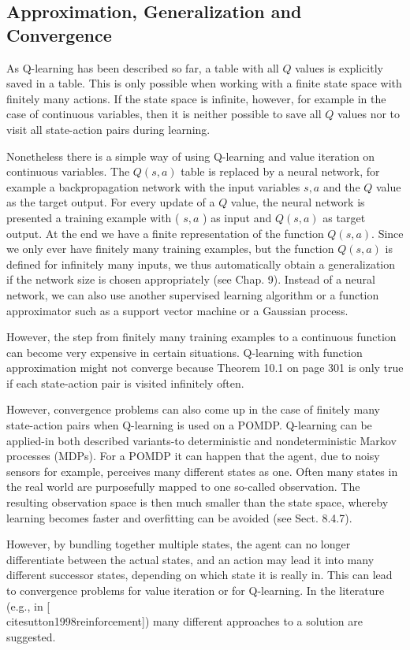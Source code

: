\documentclass[10pt]{book}
\begin{document}
\subsection*{Approximation, Generalization and Convergence}
As Q-learning has been described so far, a table with all $Q$ values is explicitly saved in a table. This is only possible when working with a finite state space with finitely many actions. If the state space is infinite, however, for example in the case of continuous variables, then it is neither possible to save all $Q$ values nor to visit all state-action pairs during learning.


Nonetheless there is a simple way of using Q-learning and value iteration on continuous variables. The $Q(s, a)$ table is replaced by a neural network, for example a backpropagation network with the input variables $s, a$ and the $Q$ value as the target output. For every update of a $Q$ value, the neural network is presented a training example with ( $s, a$ ) as input and $Q(s, a)$ as target output. At the end we have a finite representation of the function $Q(s, a)$. Since we only ever have finitely many training examples, but the function $Q(s, a)$ is defined for infinitely many inputs, we thus automatically obtain a generalization if the network size is chosen appropriately (see Chap. 9). Instead of a neural network, we can also use another supervised learning algorithm or a function approximator such as a support vector machine or a Gaussian process.

However, the step from finitely many training examples to a continuous function can become very expensive in certain situations. Q-learning with function approximation might not converge because Theorem 10.1 on page 301 is only true if each state-action pair is visited infinitely often.

However, convergence problems can also come up in the case of finitely many state-action pairs when Q-learning is used on a POMDP. Q-learning can be applied-in both described variants-to deterministic and nondeterministic Markov processes (MDPs). For a POMDP it can happen that the agent, due to noisy sensors for example, perceives many different states as one. Often many states in the real world are purposefully mapped to one so-called observation. The resulting observation space is then much smaller than the state space, whereby learning becomes faster and overfitting can be avoided (see Sect. 8.4.7).

However, by bundling together multiple states, the agent can no longer differentiate between the actual states, and an action may lead it into many different successor states, depending on which state it is really in. This can lead to convergence problems for value iteration or for Q-learning. In the literature (e.g., in [\\cite{sutton1998reinforcement}]) many different approaches to a solution are suggested.
\end{document}
